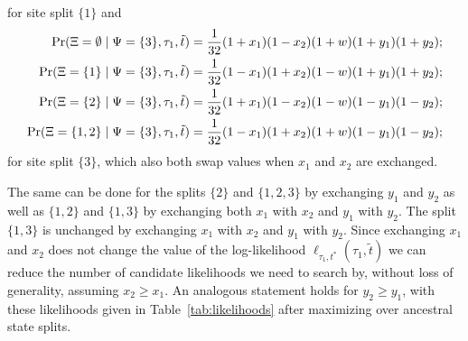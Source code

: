 for site split $\{1\}$ and
\begin{align*}
        \Pr(\Xi=\emptyset \mid \Psi=\{3\}, \tau_1, \tilde{t}) &= \frac{1}{32}(1+x_1)(1-x_2)(1+w)(1+y_1)(1+y_2); \\
    \Pr(\Xi=\{1\} \mid \Psi=\{3\}, \tau_1, \tilde{t}) &= \frac{1}{32}(1-x_1)(1+x_2)(1-w)(1+y_1)(1+y_2); \\
    \Pr(\Xi=\{2\} \mid \Psi=\{3\}, \tau_1, \tilde{t}) &= \frac{1}{32}(1+x_1)(1-x_2)(1-w)(1-y_1)(1-y_2); \\
    \Pr(\Xi=\{1,2\} \mid \Psi=\{3\}, \tau_1, \tilde{t}) &= \frac{1}{32}(1-x_1)(1+x_2)(1+w)(1-y_1)(1-y_2);
\end{align*}
for site split $\{3\}$, which also both swap values when $x_1$ and $x_2$ are exchanged.

The same can be done for the splits $\{2\}$ and $\{1,2,3\}$ by exchanging $y_1$ and $y_2$ as well as $\{1,2\}$ and $\{1,3\}$ by exchanging both $x_1$ with $x_2$ and $y_1$ with $y_2$.
The split $\{1,3\}$ is unchanged by exchanging $x_1$ with $x_2$ and $y_1$ with $y_2$.
Since exchanging $x_1$ and $x_2$ does not change the value of the log-likelihood $\ell_{\tau_1,t^*}(\tau_1, \tilde{t})$ we can reduce the number of candidate likelihoods we need to search by, without loss of generality, assuming $x_2 \ge x_1$.
An analogous statement holds for $y_2 \ge y_1$, with these likelihoods given in Table~\ref{tab:likelihoods} after maximizing over ancestral state splits.

